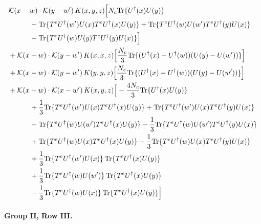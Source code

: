 \documentclass[10pt]{article}
\numberwithin{equation}{section}
\begin{document}
\begin{align}
&\mathcal K(x-w)\cdot\mathcal K(y-w')\,K(x,y,z)\Big[N_c{\rm Tr}\{U^\dagger(x)U(y)\}\notag\\
&\quad\quad\quad-{\rm Tr}\{T^eU^\dagger(w')U(x)T^eU^\dagger(x)U(y)\}+{\rm Tr}\{T^eU^\dagger(w)U(w')T^eU^\dagger(y)U(x)\}\notag\\
&\quad\quad\quad-{\rm Tr}\{T^eU^\dagger(w)U(y)T^eU^\dagger(y)U(x)\}\Big]\notag\\
&+\mathcal K(x-w)\cdot\mathcal K(y-w')\,K(x,x,z)\Big[\frac{N_c}{3}{\rm Tr}\{(U^\dagger(x)-U^\dagger(w))(U(y)-U(w'))\}\Big]\notag\\
&+\mathcal K(x-w)\cdot\mathcal K(y-w')\,K(y,y,z)\Big[\frac{N_c}{3}{\rm Tr}\{(U^\dagger(x)-U^\dagger(w))(U(y)-U(w'))\}\Big]\notag\\
&+\mathcal K(x-w)\cdot\mathcal K(x-w')\,K(x,y,z)\Big[-\frac{4 N_c}{3}{\rm Tr}\{U^\dagger(x)U(y)\}\notag\\
&\quad\quad\quad+\frac{1}{3}{\rm Tr}\{T^eU^\dagger(w')U(x)T^eU^\dagger(x)U(y)\}+{\rm Tr}\{T^eU^\dagger(w')U(x)T^eU^\dagger(y)U(x)\}\notag\\
&\quad\quad\quad-{\rm Tr}\{T^eU^\dagger(w)U(w')T^eU^\dagger(x)U(y)\}-\frac{1}{3}{\rm Tr}\{T^eU^\dagger(w)U(w')T^eU^\dagger(y)U(x)\}\notag\\
&\quad\quad\quad+{\rm Tr}\{T^eU^\dagger(w)U(x)T^eU^\dagger(x)U(y)\}+\frac{1}{3}{\rm Tr}\{T^eU^\dagger(w)U(x)T^eU^\dagger(y)U(x)\}\notag\\
&\quad\quad\quad+\frac{1}{3}{\rm Tr}\{T^eU^\dagger(w')U(x)\}\,{\rm Tr}\{T^eU^\dagger(x)U(y)\}\notag\\
&\quad\quad\quad+\frac{1}{3}{\rm Tr}\{T^eU^\dagger(w)U(w')\}\,{\rm Tr}\{T^eU^\dagger(x)U(y)\}\notag\\
&\quad\quad\quad-\frac{1}{3}{\rm Tr}\{T^eU^\dagger(w)U(x)\}\,{\rm Tr}\{T^eU^\dagger(x)U(y)\}\Big]
\label{eq:G2II}
\end{align}

\paragraph{Group II, Row III.}
\end{document}
